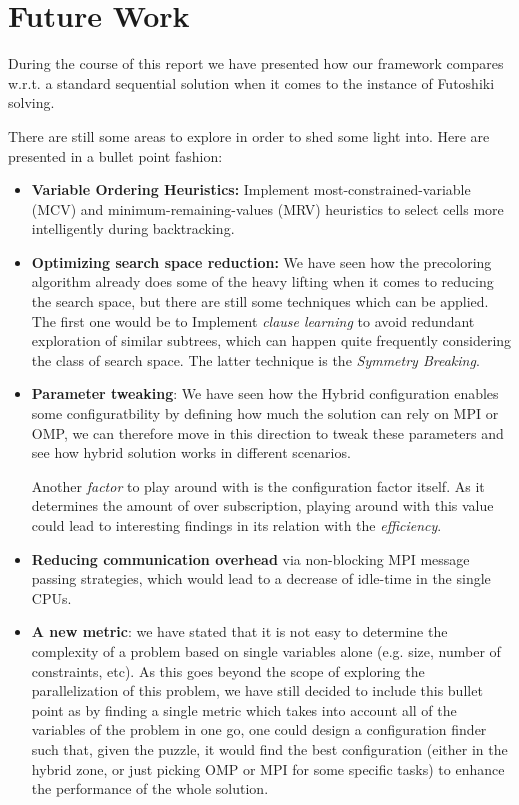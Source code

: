 \section{Future Work}
\label{sec:future_work}
During the course of this report we have presented how our framework compares w.r.t. a standard sequential solution when it comes to the instance of Futoshiki solving. 

There are still some areas to explore in order to shed some light into. Here are presented in a bullet point fashion:

\begin{itemize}
    \item \textbf{Variable Ordering Heuristics:} Implement most-constrained-variable (MCV) and minimum-remaining-values (MRV) heuristics to select cells more intelligently during backtracking.
    
    \item \textbf{Optimizing search space reduction:} We have seen how the precoloring algorithm already does some of the heavy lifting when it comes to reducing the search space, but there are still some techniques which can be applied. The first one would be to  Implement \textit{clause learning} to avoid redundant exploration of similar subtrees, which can happen quite frequently considering the class of search space. The latter technique is the \textit{Symmetry Breaking}.
    
    \item \textbf{Parameter tweaking}: We have seen how the Hybrid configuration enables some configuratbility by defining how much the solution can rely on MPI or OMP, we can therefore move in this direction to tweak these parameters and see how hybrid solution works in different scenarios.

    Another \textit{factor }to play around with is the configuration factor itself. As it determines the amount of over subscription, playing around with this value could lead to interesting findings in its relation with the \textit{efficiency}.
    \item \textbf{Reducing communication overhead} via non-blocking MPI message passing strategies, which would lead to a decrease of idle-time in the single CPUs.

    \item \textbf{A new metric}: we have stated that it is not easy to determine the complexity of a problem based on single variables alone (e.g. size, number of constraints, etc). As this goes beyond the scope of exploring the parallelization of this problem, we have still decided to include this bullet point as by finding a single metric which takes into account all of the variables of the problem in one go, one could design a configuration finder such that, given the puzzle, it would find the best configuration (either in the hybrid zone, or just picking OMP or MPI for some specific tasks) to enhance the performance of the whole solution.


\end{itemize}
